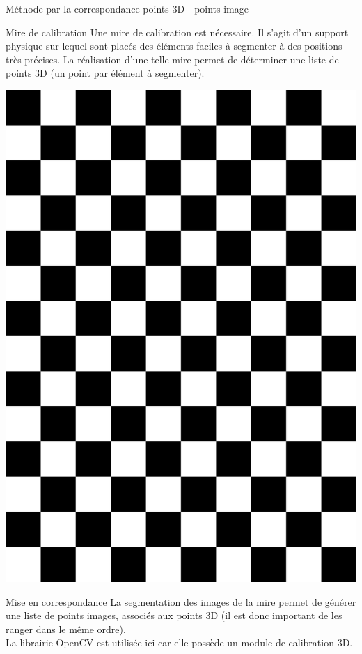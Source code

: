 \documentclass[8pt]{beamer}
\begin{document}
	\begin{frame}{Méthode par la correspondance points 3D - points image}
		\begin{block}{Mire de calibration}
			Une mire de calibration est nécessaire. Il s'agit d'un support physique sur lequel sont placés des éléments faciles à segmenter à des positions très précises. La réalisation d'une telle mire permet de déterminer une liste de points 3D (un point par élément à segmenter).
			\begin{center}
				\includegraphics[width=.28\textwidth, angle=90]{chessBoard14x10_25mm.pdf}
			\end{center}
		\end{block}
		\begin{block}{Mise en correspondance}
			La segmentation des images de la mire permet de générer une liste de points images, associés aux points 3D (il est donc important de les ranger dans le même ordre).
			\\La librairie OpenCV est utilisée ici car elle possède un module de calibration 3D.
		\end{block}
	\end{frame}
\end{document}
